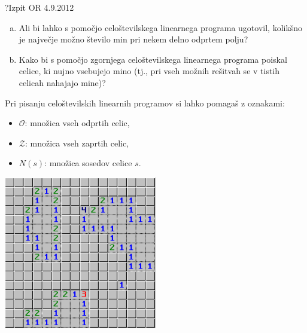 \begin{naloga}{?}{Izpit OR 4.9.2012}
\begin{vprasanje}
\begin{enumerate}[(a)]
\item Ali bi lahko s pomočjo celoštevilskega linearnega programa ugotovil,
kolikšno je največje možno število min pri nekem delno odprtem polju?

\item Kako bi s pomočjo zgornjega celoštevilskega linearnega programa
poiskal celice, ki nujno vsebujejo mino
(tj., pri vseh možnih rešitvah se v tistih celicah nahajajo mine)?
\end{enumerate}
Pri pisanju celoštevilskih linearnih programov si lahko pomagaš z oznakami:
\begin{itemize}
\item ${\mathcal O}$: množica vseh odprtih celic,
\item ${\mathcal Z}$: množica vseh zaprtih celic,
\item $N(s)$: množica sosedov celice $s$.
\end{itemize}

\begin{slika}
\includegraphics[width=0.5\textwidth]{slike/minolovec.png}
\end{slika}
\end{vprasanje}
\begin{odgovor}
\end{odgovor}
\end{naloga}
